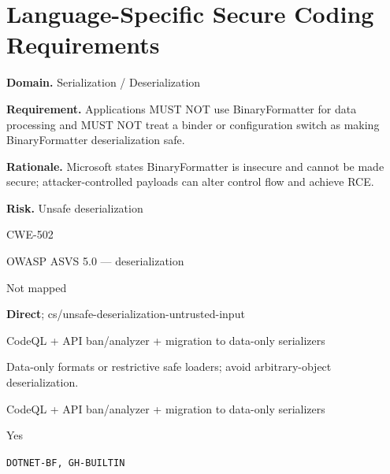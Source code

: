 \documentclass[10pt,letterpaper]{article}
\newcommand{\prioritybadge}[2]{\tcbox[on line,boxrule=0pt,arc=1.2mm,boxsep=0.7mm,left=1mm,right=1mm,top=0.4mm,bottom=0.4mm,colback=#2!12,coltext=#2]{\scriptsize\bfseries #1}}
\begin{document}
\section{Language-Specific Secure Coding Requirements}
\begin{rulebox}[title={\texttt{SCS-CSHARP-DESER-001} \hfill \prioritybadge{Critical Control}{Critical}}]
\textbf{Domain.} Serialization / Deserialization

\textbf{Requirement.} Applications MUST NOT use BinaryFormatter for data processing and MUST NOT treat a binder or configuration switch as making BinaryFormatter deserialization safe.

\textbf{Rationale.} Microsoft states BinaryFormatter is insecure and cannot be made secure; attacker-controlled payloads can alter control flow and achieve RCE.

\textbf{Risk.} Unsafe deserialization

\begin{description}[leftmargin=2.65cm,labelwidth=2.3cm,style=nextline,itemsep=1pt,topsep=3pt]
  \item[CWE] CWE-502
  \item[OWASP] OWASP ASVS 5.0 --- deserialization
  \item[CERT] Not mapped
  \item[CodeQL] \textbf{Direct}; cs/unsafe-deserialization-untrusted-input
  \item[Enforcement] CodeQL + API ban/analyzer + migration to data-only serializers
  \item[Prevention] Data-only formats or restrictive safe loaders; avoid arbitrary-object deserialization.
  \item[Verification] CodeQL + API ban/analyzer + migration to data-only serializers
  \item[Automation] Yes
  \item[Sources] \texttt{DOTNET-BF, GH-BUILTIN}
\end{description}
\end{rulebox}
\end{document}
